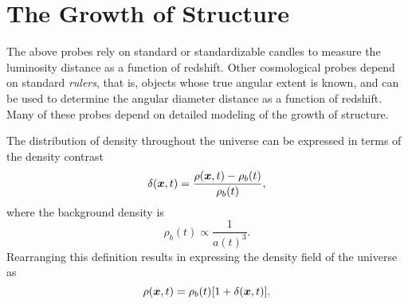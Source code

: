 \section{The Growth of Structure}
\label{sec:growth}
The above probes rely on standard or standardizable candles to measure the
luminosity distance as a function of redshift.  Other cosmological probes
depend on standard {\it rulers}, that is, objects whose true angular extent
is known, and can be used to determine the angular diameter distance as
a function of redshift.  Many of these probes depend on detailed modeling
of the growth of structure.

The distribution of density throughout the universe can be expressed
in terms of the density contrast
\begin{equation}
  \label{eq:overdensity}
  \delta(\boldsymbol{x}, t) = \frac{\rho(\boldsymbol{x}, t) - \rho_b(t)}{\rho_b(t)},
\end{equation}
where the background density is
\begin{equation}
  \rho_b(t) \propto \frac{1}{a(t)^3}.
\end{equation}
Rearranging this definition results in expressing the density field of the
universe as
\begin{equation}
  \rho(\boldsymbol{x}, t) = \rho_b(t)[1 + \delta(\boldsymbol{x}, t)].
\end{equation}

